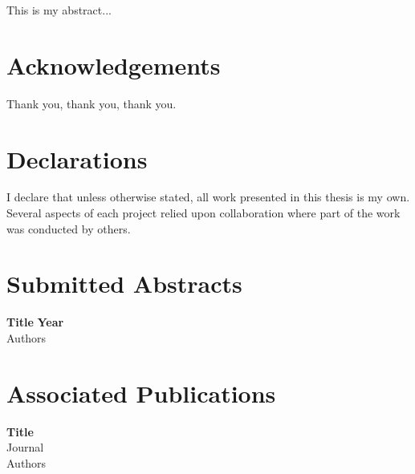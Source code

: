\noindent
This is my abstract... \\




\newpage
\chapter*{Acknowledgements}
\thispagestyle{plain}
\noindent
%
Thank you, thank you, thank you.

\newpage
\chapter*{Declarations}
\thispagestyle{plain}
\noindent
I declare that unless otherwise stated, all work presented in this thesis is my own. Several aspects of each project relied upon collaboration where part of the work was conducted by others.


\newpage
\chapter*{Submitted Abstracts}
\thispagestyle{plain} %
\noindent

\noindent
\textbf{Title}
\hfill \textbf{Year}\\
Authors\\

\newpage
\chapter*{Associated Publications}
\thispagestyle{plain} %
\noindent
\textbf{Title}\\
Journal\\
Authors\\

